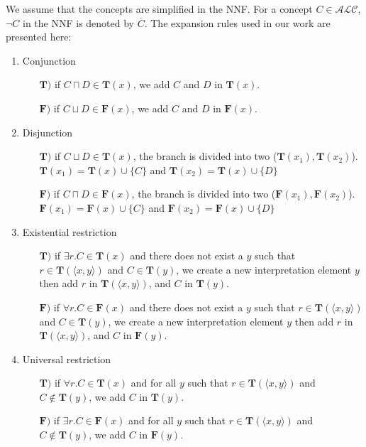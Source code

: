 \documentclass{article}
\begin{document}
We assume that the concepts are simplified in the NNF. For a concept $C \in \mathcal{ALC} $, $\neg C$ in the NNF is denoted by $\overline{C}$.
The expansion rules used in our work are presented here:
\begin{enumerate}
	 \item Conjunction
	       \begin{itemize}
	        \item  [$\mathbf{T)}$] if $C\sqcap D \in \mathbf{T}(x)$, we add $C$ and $D$ in $\mathbf{T}(x)$.
	        \item  [$\mathbf{F)}$] if $C\sqcup D \in \mathbf{F}(x)$, we add $C$ and $D$ in $\mathbf{F}(x)$.
	       \end{itemize}
	 \item Disjunction
	       \begin{itemize}
		\item  [$\mathbf{T)}$]  if $C\sqcup D \in \mathbf{T}(x)$, the branch is divided into two  ($\mathbf{T}(x_1),\mathbf{T}(x_2)$).
			$\mathbf{T}(x_1)= \mathbf{T}(x) \cup \{C\}$ and $\mathbf{T}(x_2)=\mathbf{T}(x) \cup \{D\}$
	        \item  [$\mathbf{F)}$]  if $C\sqcap D \in \mathbf{F}(x)$, the branch is divided into two ($\mathbf{F}(x_1),\mathbf{F}(x_2)$).
	        $\mathbf{F}(x_1)= \mathbf{F}(x) \cup \{C\}$ and $\mathbf{F}(x_2)=\mathbf{F}(x) \cup \{D\}$
	       \end{itemize}
	 \item Existential restriction
	       \begin{itemize}
	       \item  [$\mathbf{T)}$]  if $\exists r.C \in \mathbf{T}(x)$ and there does not exist a $y$ such that $r \in \mathbf{T}(\langle x,y \rangle)$ and $C \in \mathbf{T}(y)$, 
	       we create a new interpretation element $y$  then add $r$ in  $\mathbf{T}(\langle x,y \rangle)$, and $C$ in $\mathbf{T}(y)$.
	        \item  [$\mathbf{F)}$]  if $\forall r.C \in \mathbf{F}(x)$ and there does not exist a $y$ such that $r \in \mathbf{T}(\langle x,y \rangle)$ and $C \in \mathbf{T}(y)$, 
	       we create a new interpretation element $y$ then add $r$ in  $\mathbf{T}(\langle x,y \rangle)$, and $C$ in $\mathbf{F}(y)$.
	       \end{itemize}
	 \item Universal restriction
	       \begin{itemize}
 	        \item  [$\mathbf{T)}$]  if $\forall r.C \in \mathbf{T}(x)$ and for all $y$ such that $r \in \mathbf{T}(\langle x,y \rangle)$ and $C\notin\mathbf{T}(y)$, we add $C$ in  $\mathbf{T}(y)$.
	        \item  [$\mathbf{F)}$]  if $\exists r.C \in \mathbf{F}(x)$ and for all $y$ such that $r \in \mathbf{T}(\langle x,y \rangle)$ and $C\notin\mathbf{T}(y)$, we add $C$ in  $\mathbf{F}(y)$.
	       \end{itemize}	


\end{enumerate}
\end{document}
